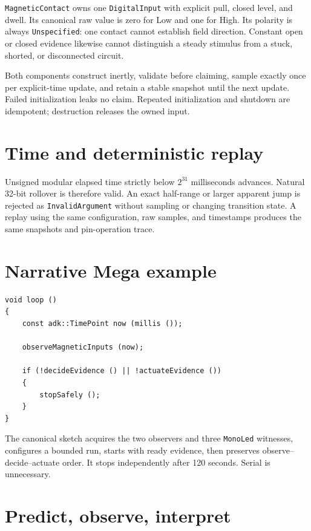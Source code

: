 \documentclass[11pt]{article}
\begin{document}
\texttt{MagneticContact} owns one \texttt{DigitalInput} with explicit pull,
closed level, and dwell. Its canonical raw value is zero for Low and one for
High. Its polarity is always \texttt{Unspecified}: one contact cannot establish
field direction. Constant open or closed evidence likewise cannot distinguish
a steady stimulus from a stuck, shorted, or disconnected circuit.

Both components construct inertly, validate before claiming, sample exactly
once per explicit-time update, and retain a stable snapshot until the next
update. Failed initialization leaks no claim. Repeated initialization and
shutdown are idempotent; destruction releases the owned input.

\section{Time and deterministic replay}

Unsigned modular elapsed time strictly below \(2^{31}\) milliseconds advances.
Natural 32-bit rollover is therefore valid. An exact half-range or larger
apparent jump is rejected as \texttt{InvalidArgument} without sampling or
changing transition state. A replay using the same configuration, raw samples,
and timestamps produces the same snapshots and pin-operation trace.

\section{Narrative Mega example}

\begin{lstlisting}[style=adkcpp]
void loop ()
{
    const adk::TimePoint now (millis ());

    observeMagneticInputs (now);

    if (!decideEvidence () || !actuateEvidence ())
    {
        stopSafely ();
    }
}
\end{lstlisting}

The canonical sketch acquires the two observers and three \texttt{MonoLed}
witnesses, configures a bounded run, starts with ready evidence, then preserves
observe--decide--actuate order. It stops independently after 120 seconds.
Serial is unnecessary.

\section{Predict, observe, interpret}
\end{document}
